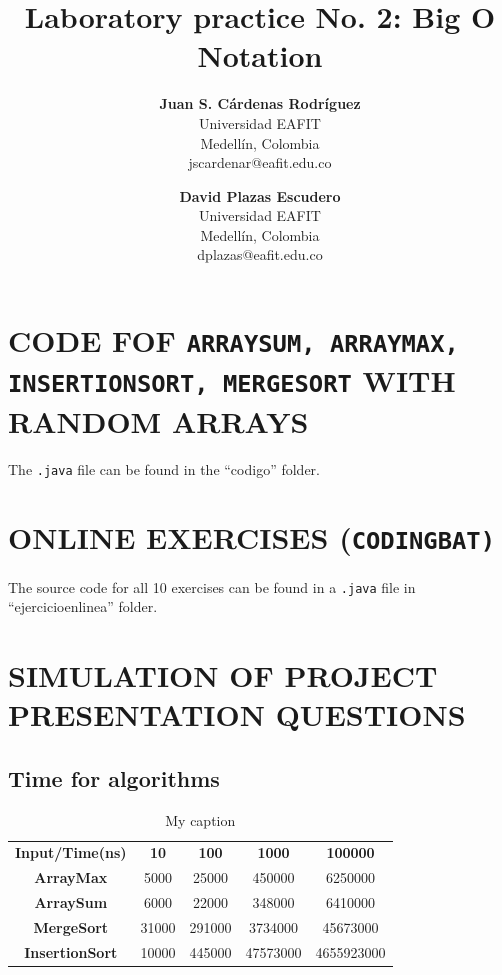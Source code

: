 \documentclass[a4paper,12pt]{article}
\title{\color{Eblue}\textbf{Laboratory practice No. 2: Big O Notation}}
\author{
  \textbf{Juan S. Cárdenas Rodríguez}\\
  Universidad EAFIT\\
  Medellín, Colombia\\
  jscardenar@eafit.edu.co
\and
  \textbf{David Plazas Escudero}\\
  Universidad EAFIT\\
  Medellín, Colombia\\
  dplazas@eafit.edu.co
}
\begin{document}
  \maketitle
  \thispagestyle{fancy}

  \section{CODE FOF \texttt{ARRAYSUM, ARRAYMAX, INSERTIONSORT, MERGESORT} WITH RANDOM ARRAYS}
    The \texttt{.java} file can be found in the ``codigo'' folder.
  \section{ONLINE EXERCISES (\texttt{CODINGBAT)}}
    The source code for all 10 exercises can be found in a \texttt{.java} file in ``ejercicioenlinea'' folder.
  \section{SIMULATION OF PROJECT PRESENTATION QUESTIONS}
    \subsection{Time for algorithms}
    \begin{table}[H]
      \centering
      \caption{My caption}
      \label{my-label}
      \begin{tabular}{ccccc}
        \hline
        \textbf{Input/Time(ns)} & \textbf{10} & \textbf{100} & \textbf{1000} & \textbf{100000} \\
        \textbf{ArrayMax}       & 5000        & 25000        & 450000        & 6250000         \\
        \textbf{ArraySum}       & 6000        & 22000        & 348000        & 6410000         \\
        \textbf{MergeSort}      & 31000       & 291000       & 3734000       & 45673000        \\
        \textbf{InsertionSort}  & 10000       & 445000       & 47573000      & 4655923000      \\ \hline
      \end{tabular}
    \end{table}
\end{document}
